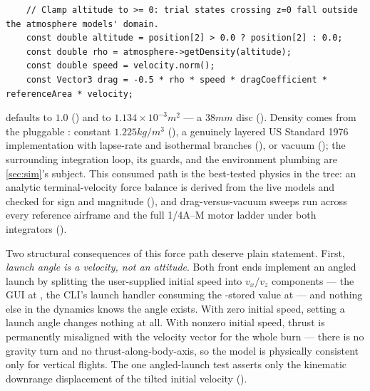 \begin{listing}[htbp]
\begin{verbatim}
    // Clamp altitude to >= 0: trial states crossing z=0 fall outside the atmosphere models' domain.
    const double altitude = position[2] > 0.0 ? position[2] : 0.0;
    const double rho = atmosphere->getDensity(altitude);
    const double speed = velocity.norm();
    const Vector3 drag = -0.5 * rho * speed * dragCoefficient * referenceArea * velocity;
\end{verbatim}
\caption{The entire production drag model (). One constant
$C_d$, one constant reference area; the $|v|\,\vec{v}$ form gives zero drag at rest with no
division, and the altitude clamp keeps trial states below ground inside the atmosphere models'
domain.}\label{lst:aero-draglaw}
\end{listing}

 defaults to $1.0$ () and
 to $1.134\times10^{-3}\unit{m^2}$ --- a $38\unit{mm}$ disc
(). Density comes from the pluggable :
constant $1.225\unit{kg/m^3}$ (), a genuinely layered US Standard
1976 implementation with lapse-rate and isothermal branches (),
or vacuum (); the surrounding integration loop, its guards, and the
environment plumbing are \cref{sec:sim}'s subject. This consumed path is the best-tested physics in
the tree: an analytic terminal-velocity force balance is derived from the live models and checked
for sign and magnitude (), and drag-versus-vacuum
sweeps run across every reference airframe and the full 1/4A--M motor ladder under both integrators
().

Two structural consequences of this force path deserve plain statement. First, \emph{launch angle
is a velocity, not an attitude}. Both front ends implement an angled launch by splitting the
user-supplied initial speed into $v_x/v_z$ components --- the GUI at
, the CLI's launch handler consuming the -stored
value at  --- and nothing else in the dynamics knows the angle exists. With
zero initial speed, setting a launch angle changes nothing at all. With nonzero initial speed,
thrust is permanently misaligned with the velocity vector for the whole burn --- there is no
gravity turn and no thrust-along-body-axis, so the model is physically consistent only for
vertical flights. The one angled-launch test asserts only the kinematic downrange displacement of
the tilted initial velocity ().

